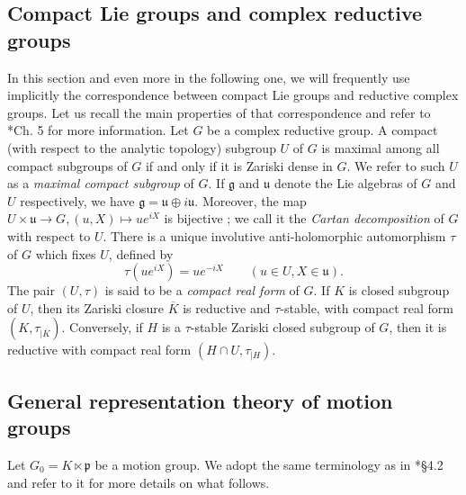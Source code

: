 \documentclass{amsart}
\theoremstyle{definition}
\begin{document}
\subsection{Compact Lie groups and complex reductive groups}
In this section and even more in the following one, we will frequently use implicitly the correspondence between compact Lie groups and reductive complex groups. Let us recall the main properties of that correspondence and refer to \cite{OV}*{Ch. 5} for more information. Let $G$ be a complex reductive group. A compact (with respect to the analytic topology) subgroup $U$ of $G$ is maximal among all compact subgroups of $G$ if and only if it is Zariski dense in $G$. We refer to such $U$ as a \textit{maximal compact subgroup} of $G$. If $\mathfrak{g}$ and $\mathfrak{u}$ denote the Lie algebras of $G$ and $U$ respectively, we have $\mathfrak{g} = \mathfrak{u} \oplus i \mathfrak{u}$. Moreover, the map $U \times \mathfrak{u} \to G, (u,X) \mapsto ue^{iX}$ is bijective ; we call it the \textit{Cartan decomposition} of $G$ with respect to $U$. There is a unique involutive anti-holomorphic automorphism $\tau$ of $G$ which fixes $U$, defined by
$$\tau(ue^{iX}) = ue^{-iX} \qquad (u \in U, X \in \mathfrak{u}).$$
The pair $(U,\tau)$ is said to be a \textit{compact real form} of $G$. If $K$ is closed subgroup of $U$, then its Zariski closure $\overline{K}$ is reductive and $\tau$-stable, with compact real form $(K,\tau_{|\overline{K}})$. Conversely, if $H$ is a $\tau$-stable Zariski closed subgroup of $G$, then it is reductive with compact real form $(H\cap U, \tau_{|H})$.

\subsection{General representation theory of motion groups} Let $G_0 = K\ltimes \mathfrak{p}$ be a motion group. We adopt the same terminology as in \cite{Warner}*{§4.2} and refer to it for more details on what follows.
\end{document}
